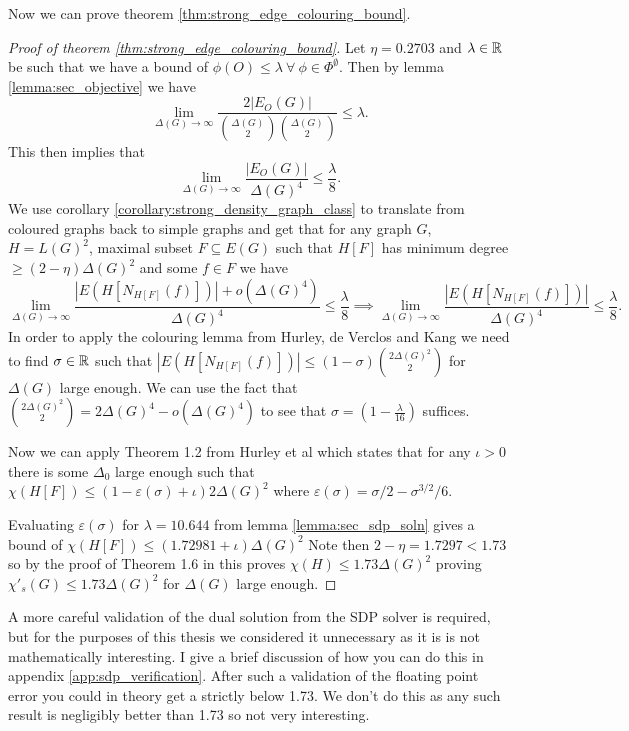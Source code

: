 Now we can prove theorem \ref{thm:strong_edge_colouring_bound}.
\begin{proof}[Proof of theorem \ref{thm:strong_edge_colouring_bound}]
    Let $\eta = 0.2703$ and $\lambda\in\mathbb{R}$ be such that we have a bound of
    $\phi(O) \leq \lambda\ \forall\ \phi\in\Phi^\emptyset$.
    Then by lemma \ref{lemma:sec_objective} we have
    \[
        \lim_{\Delta(G) \to \infty}
        \frac{2|E_O(G)|}{\binom{\Delta(G)}{2}\binom{\Delta(G)}{2}}
        \leq \lambda.
    \]
    This then implies that
    \[
        \lim_{\Delta(G) \to \infty}
        \frac{|E_O(G)|}{\Delta(G)^4}
        \leq \frac{\lambda}{8}.
    \]
    We use corollary \ref{corollary:strong_density_graph_class} to translate from
    coloured graphs back to simple graphs and get that for any graph $G$,
    $H = L(G)^2$, maximal subset $F\subseteq E(G)$ such that $H[F]$ has minimum degree
    $\geq (2-\eta)\Delta(G)^2$ and some $f\in F$ we have
    \[
        \lim_{\Delta(G) \to \infty}
        \frac{|E(H[N_{H[F]}(f)])| + o(\Delta(G)^4)}{\Delta(G)^4}
        \leq \frac{\lambda}{8}
        \implies
        \lim_{\Delta(G) \to \infty}
        \frac{|E(H[N_{H[F]}(f)])|}{\Delta(G)^4}
        \leq \frac{\lambda}{8}.
    \]
    In order to apply the colouring lemma from Hurley, de Verclos and Kang
    \cite{hurleyImprovedProcedureColouring2022} we need to find $\sigma\in\mathbb{R}$ such that
    $|E(H[N_{H[F]}(f)])| \leq (1-\sigma)\binom{2\Delta(G)^2}{2}$ for $\Delta(G)$ large
    enough. We can use the fact that
    $\binom{2\Delta(G)^2}{2} = 2\Delta(G)^4 - o(\Delta(G)^4)$
    to see that $\sigma = (1-\frac{\lambda}{16})$ suffices.

    Now we can apply Theorem 1.2 from Hurley et al \cite{hurleyImprovedProcedureColouring2022}
    which states that for any $\iota > 0$ there is some $\Delta_0$ large enough such that
    $\chi(H[F]) \leq (1-\varepsilon(\sigma) + \iota)2\Delta(G)^2$
    where $\varepsilon(\sigma) = \sigma/2 - \sigma^{3/2}/6$.

    Evaluating $\varepsilon(\sigma)$ for $\lambda = 10.644$ from 
    lemma \ref{lemma:sec_sdp_soln} gives a bound of
    $\chi(H[F]) \leq (1.72981 + \iota)\Delta(G)^2$
    Note then $2-\eta = 1.7297 < 1.73$ so by the proof of Theorem 1.6 in
    \cite{hurleyImprovedProcedureColouring2022}
    this proves $\chi(H) \leq 1.73\Delta(G)^2$ proving
    $\chi'_s(G) \leq 1.73\Delta(G)^2$ for $\Delta(G)$ large enough.
\end{proof}
\begin{note}
    A more careful validation of the dual solution from the SDP solver is required,
    but for the purposes of this thesis we considered it unnecessary as it is is not
    mathematically interesting. I give a brief discussion of how you can do this in
    appendix \ref{app:sdp_verification}.
    After such a validation of the floating point error you could in theory get
    a strictly below 1.73. We don't do this
    as any such result is negligibly better than 1.73 so not very interesting.
\end{note}

